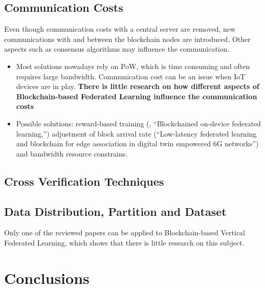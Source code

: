 \subsection{Communication Costs}


Even though communication costs with a central server are removed, new communications with and between the blockchain nodes are introduced. Other aspects such as consensus algorithms may influence the communication.

\begin{itemize}
    \item Most solutions nowadays rely on PoW, which is time consuming and often requires large bandwidth. Communication cost can be an issue when IoT devices are in play. \textbf{There is little research on how different aspects of Blockchain-based Federated Learning influence the communication costs} \cite{9403374}
    
    \item Possible solutions: reward-based training (\cite{9079513}, “Blockchained on-device federated learning,”) adjustment of block arrival rate (“Low-latency federated learning and blockchain for edge association in digital twin empowered 6G networks”) and bandwidth resource constrains.
\end{itemize}

\subsection{Cross Verification Techniques}


\subsection{Data Distribution, Partition and Dataset}



 Only one of the reviewed papers can be applied to Blockchain-based Vertical Federated Learning, which shows that there is little research on this subject.

\section{Conclusions}

